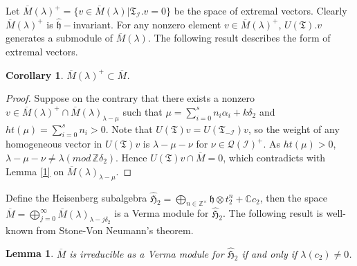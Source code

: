 \documentclass[11pt]{amsproc}
\newtheorem{lemma}[theorem]{Lemma}
\newtheorem{corollary}[theorem]{Corollary}
\theoremstyle{definition}
\theoremstyle{remark}
\numberwithin{equation}{section} \errorcontextlines=0
\begin{document}
Let $\overline{M}(\lambda)^{+}=\{v\in\overline{M}(\lambda)|\mathfrak
T_{\mathcal {I}}.v=0\}$ be the space of extremal vectors. Clearly
$\overline{M}(\lambda)^{+}$ is $\hat{\mathfrak h}-$invariant. For
any nonzero element $v\in\overline{M}(\lambda)^{+}$, $U(\mathfrak
T).v$ generates a submodule of $\overline{M}(\lambda)$. The
following result describes the form of extremal vectors.

\begin{corollary}\label{subset}
$\overline{M}(\lambda)^{+}\subset \overline{M}$.
\end{corollary}
\begin{proof} Suppose on the contrary that there exists a nonzero $v\in \overline{M}(\lambda)^{+}\cap
\overline{M}(\lambda)_{\lambda-\mu}$ such that
$\mu=\sum\limits_{i=0}^s n_i\alpha_i+k\delta_2$ and $ht(\mu)=
\sum\limits_{i=0}^s n_i> 0$. Note that $U(\mathfrak T)v= U(\mathfrak
T_{-\mathcal {I}})v$, so the weight of any homogeneous vector in
$U(\mathfrak T)v$ is $\lambda-\mu-\nu$ for $\nu\in\mathcal
{Q}(\mathcal I)^{+}$. As $ht(\mu)>0$,
$\lambda-\mu-\nu\neq \lambda (mod\, \mathbb Z\delta_2)$. Hence
$U(\mathfrak T)v\cap \overline{M}= 0$, which contradicts with Lemma
\ref{1} on
$\overline{M}(\lambda)_{\lambda-\mu}$.
\end{proof}

Define the Heisenberg subalgebra $\hat{\mathfrak
H}_2=\bigoplus_{n\in\mathbb Z^{\times}}\mathfrak h\otimes
t_2^n+\mathbb Cc_2$, then the space
$\overline{M}=\bigoplus_{j=0}^{\infty}\overline{M}({\lambda})_{{\lambda}-j\delta_2}$
is a Verma module for 
$\hat{\mathfrak H}_2$.
The following result is well-known from Stone-Von Neumann's theorem.

\begin{lemma}\label {2}
$\overline{M}$ is irreducible as a Verma module for $\hat{\mathfrak H}_2$ if
and only if $\lambda(c_2)\neq 0$.
\end{lemma}
\end{document}

